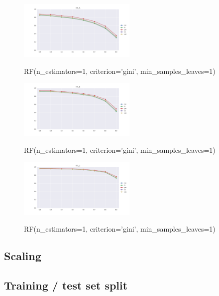 \documentclass{sig-alternate-05-2015}
\begin{document}
\begin{figure}[]
  \centering
  \caption{RF(n\_estimators=1, criterion='gini', min\_samples\_leaves=1)}
  \includegraphics[width=0.5\textwidth]{../plots/RF_A}
  \label{fig:anomalySetup}
\end{figure}

\begin{figure}[]
  \centering
  \caption{RF(n\_estimators=1, criterion='gini', min\_samples\_leaves=1)}
  \includegraphics[width=0.5\textwidth]{../plots/RF_B}
  \label{fig:anomalySetup}
\end{figure}

\begin{figure}[]
  \centering
  \caption{RF(n\_estimators=1, criterion='gini', min\_samples\_leaves=1)}
  \includegraphics[width=0.5\textwidth]{../plots/RF_C}
  \label{fig:anomalySetup}
\end{figure}





\subsection{Scaling}

\subsection{Training / test set split}
\end{document}
